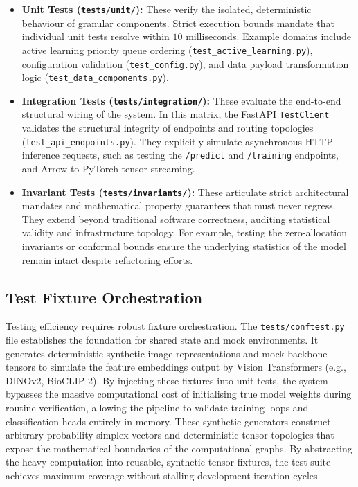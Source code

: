 \begin{itemize}
    \item \textbf{Unit Tests (\texttt{tests/unit/}):} These verify the isolated, deterministic behaviour of granular components. Strict execution bounds mandate that individual unit tests resolve within $10$ milliseconds. Example domains include active learning priority queue ordering (\texttt{test\_active\_learning.py}), configuration validation (\texttt{test\_config.py}), and data payload transformation logic (\texttt{test\_data\_components.py}). 
    \item \textbf{Integration Tests (\texttt{tests/integration/}):} These evaluate the end-to-end structural wiring of the system. In this matrix, the FastAPI \texttt{TestClient} validates the structural integrity of endpoints and routing topologies (\texttt{test\_api\_endpoints.py}). They explicitly simulate asynchronous HTTP inference requests, such as testing the \texttt{/predict} and \texttt{/training} endpoints, and Arrow-to-PyTorch tensor streaming.
    \item \textbf{Invariant Tests (\texttt{tests/invariants/}):} These articulate strict architectural mandates and mathematical property guarantees that must never regress. They extend beyond traditional software correctness, auditing statistical validity and infrastructure topology. For example, testing the zero-allocation invariants or conformal bounds ensure the underlying statistics of the model remain intact despite refactoring efforts.
\end{itemize}

\subsection{Test Fixture Orchestration}

Testing efficiency requires robust fixture orchestration. The \texttt{tests/conftest.py} file establishes the foundation for shared state and mock environments. It generates deterministic synthetic image representations and mock backbone tensors to simulate the feature embeddings output by Vision Transformers (e.g., DINOv2, BioCLIP-2). By injecting these fixtures into unit tests, the system bypasses the massive computational cost of initialising true model weights during routine verification, allowing the pipeline to validate training loops and classification heads entirely in memory. These synthetic generators construct arbitrary probability simplex vectors and deterministic tensor topologies that expose the mathematical boundaries of the computational graphs. By abstracting the heavy computation into reusable, synthetic tensor fixtures, the test suite achieves maximum coverage without stalling development iteration cycles.


